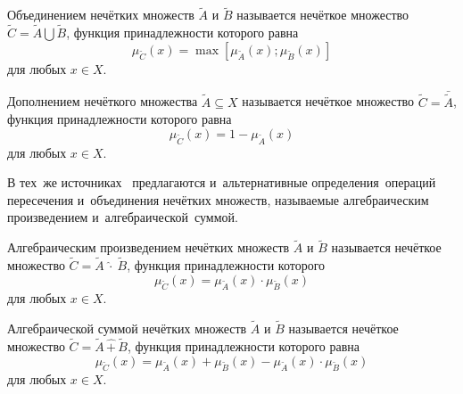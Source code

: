 \begin{mydef}
Объединением нечётких множеств $\tilde{A}$ и $\tilde{B}$ называется нечёткое множество $\displaystyle \tilde{C}=\tilde{A}\bigcup \tilde{B}$, функция принадлежности которого равна
\begin{equation}
\label{eq:fuzzy-union}
	{{\mu }_{{\tilde{C}}}}\left( x \right)=\max \left[ {{\mu }_{{\tilde{A}}}}\left( x \right);{{\mu }_{{\tilde{B}}}}\left( x \right) \right]
\end{equation}
для любых $x\in X$.
\end{mydef}

\begin{mydef}
Дополнением нечёткого множества $\tilde{A}\subseteq X$ называется нечёткое множество $\displaystyle \tilde{C}=\bar{\tilde{A}}$, функция принадлежности которого равна
\begin{equation}
\label{eq:fuzzy-minus}
	{{\mu }_{{\tilde{C}}}}\left( x \right)=1-{{\mu }_{{\tilde{A}}}}\left( x \right)
\end{equation}
для любых $x\in X$.
\end{mydef}

В тех~же источниках~\cite{Rutkovskaya, Borisov_Alexeev_Msk, Borisov_Krumberg_Riga, Kaufmann} предлагаются и~альтернативные определения~операций пересечения и~объединения нечётких множеств, называемые алгебраическим произведением и~алгебраической~суммой.
\begin{mydef}
Алгебраическим произведением нечётких множеств $\tilde{A}$ и $\tilde{B}$ называется нечёткое множество $\displaystyle \tilde{C}=\tilde{A}\ \widehat{\cdot}\ \tilde{B}$, функция принадлежности которого
\begin{equation}
\label{eq:fuzzy-cross-mult}
	\mu_{\tilde C} \left( x \right)=\mu_{\tilde A}\left( x \right) \cdot \mu_{\tilde B}\left( x \right)
\end{equation}
для любых $x\in X$.
\end{mydef}

\begin{mydef}
Алгебраической суммой нечётких множеств $\tilde{A}$ и $\tilde{B}$ называется нечёткое множество $\displaystyle \tilde{C}=\tilde{A}\, \widehat{+}\, \tilde{B}$, функция принадлежности которого равна
\begin{equation}
\label{eq:fuzzy-union-summ}
		\mu_{\tilde C} \left( x \right)=\mu_{\tilde A}\left( x \right) + \mu_{\tilde B}\left( x \right) - \mu_{\tilde A}\left( x \right) \cdot \mu_{\tilde B}\left( x \right)
\end{equation}
для любых $x\in X$.
\end{mydef} 

